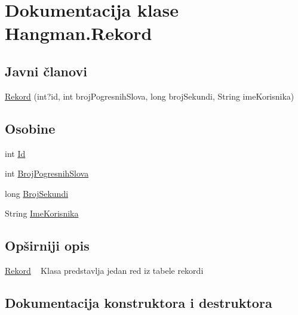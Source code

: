 \hypertarget{classHangman_1_1Rekord}{}\section{Dokumentacija klase Hangman.\+Rekord}
\label{classHangman_1_1Rekord}
\subsection*{Javni članovi}
\begin{DoxyCompactItemize}
\item 
\hyperlink{classHangman_1_1Rekord_a55aae169dd356e2b4809cb3372b550b1}{Rekord} (int?id, int broj\+Pogresnih\+Slova, long broj\+Sekundi, String ime\+Korisnika)
\end{DoxyCompactItemize}
\subsection*{Osobine}
\begin{DoxyCompactItemize}
\item 
int \hyperlink{classHangman_1_1Rekord_a80a64fd7b7b6c5f239d5a218c1eb3312}{Id}
\item 
int \hyperlink{classHangman_1_1Rekord_a12ef9615b02d723769c4d90f37b95985}{Broj\+Pogresnih\+Slova}
\item 
long \hyperlink{classHangman_1_1Rekord_a2789776fa83a4ee6c5ecc64e0856abef}{Broj\+Sekundi}
\item 
String \hyperlink{classHangman_1_1Rekord_a2f7bebc6fd9da6c2b32a783edcfb1e5b}{Ime\+Korisnika}
\end{DoxyCompactItemize}


\subsection{Opširniji opis}
\hyperlink{classHangman_1_1Rekord}{Rekord} ~\newline
 Klasa predstavlja jedan red iz tabele rekordi 

\subsection{Dokumentacija konstruktora i destruktora}
\hypertarget{classHangman_1_1Rekord_a55aae169dd356e2b4809cb3372b550b1}{}
